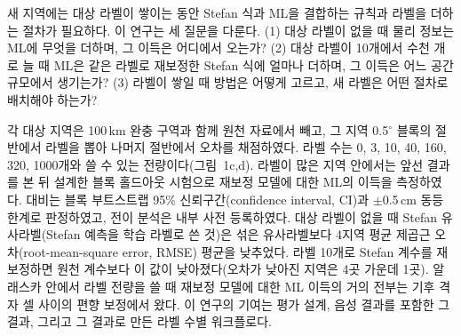 새 지역에는 대상 라벨이 쌓이는 동안 Stefan 식과 ML을 결합하는 규칙과 라벨을 더하는 절차가 필요하다. 이 연구는 세 질문을 다룬다. (1) 대상 라벨이 없을 때 물리 정보는 ML에 무엇을 더하며, 그 이득은 어디에서 오는가? (2) 대상 라벨이 10개에서 수천 개로 늘 때 ML은 같은 라벨로 재보정한 Stefan 식에 얼마나 더하며, 그 이득은 어느 공간 규모에서 생기는가? (3) 라벨이 쌓일 때 방법은 어떻게 고르고, 새 라벨은 어떤 절차로 배치해야 하는가?

각 대상 지역은 100\,km 완충 구역과 함께 원천 자료에서 빼고, 그 지역 0.5$^{\circ}$ 블록의 절반에서 라벨을 뽑아 나머지 절반에서 오차를 채점하였다. 라벨 수는 0, 3, 10, 40, 160, 320, 1000개와 쓸 수 있는 전량이다(그림~1c,d). 라벨이 많은 지역 안에서는 앞선 결과를 본 뒤 설계한 블록 홀드아웃 시험으로 재보정 모델에 대한 ML의 이득을 측정하였다. 대비는 블록 부트스트랩 95\% 신뢰구간(confidence interval, CI)과 $\pm$0.5\,cm 동등 한계로 판정하였고, 전이 분석은 내부 사전 등록하였다. 대상 라벨이 없을 때 Stefan 유사라벨(Stefan 예측을 학습 라벨로 쓴 것)은 섞은 유사라벨보다 4지역 평균 제곱근 오차(root-mean-square error, RMSE) 평균을 낮추었다. 라벨 10개로 Stefan 계수를 재보정하면 원천 계수보다 이 값이 낮아졌다(오차가 낮아진 지역은 4곳 가운데 1곳). 알래스카 안에서 라벨 전량을 쓸 때 재보정 모델에 대한 ML 이득의 거의 전부는 기후 격자 셀 사이의 편향 보정에서 왔다. 이 연구의 기여는 평가 설계, 음성 결과를 포함한 그 결과, 그리고 그 결과로 만든 라벨 수별 워크플로다.
